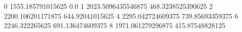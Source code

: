 0 1555.185791015625 0.0
1 2023.5096435546875 468.3238525390625
2 2200.106201171875 644.92041015625
4 2295.042724609375 739.85693359375
6 2246.322265625 691.136474609375
8 1971.061279296875 415.87548828125
